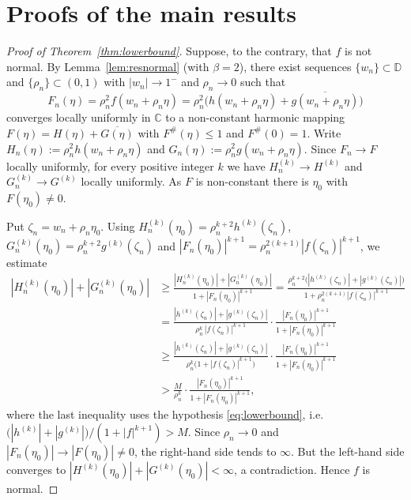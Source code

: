 \documentclass[11pt,reqno]{amsart}
\theoremstyle{definition}
\newcommand{\D}{\mathbb{D}}
\newcommand{\C}{\mathbb{C}}
\begin{document}

\section{Proofs of the main results}

\begin{proof}[Proof of Theorem~\textup{\ref{thm:lowerbound}}]
Suppose, to the contrary, that $f$ is not normal. By Lemma~\ref{lem:resnormal} (with
$\beta=2$), there exist sequences $\{w_{n}\}\subset\D$ and $\{\rho_{n}\}\subset(0,1)$ with
$|w_{n}|\to1^{-}$ and $\rho_{n}\to0$ such that
\[
F_{n}(\eta)=\rho_{n}^{2}f(w_{n}+\rho_{n}\eta)
=\rho_{n}^{2}\big(h(w_{n}+\rho_{n}\eta)+\overline{g(w_{n}+\rho_{n}\eta)}\big)
\]
converges locally uniformly in $\C$ to a non-constant harmonic mapping
$F(\eta)=H(\eta)+\overline{G(\eta)}$ with $F^{\#}(\eta)\le1$ and $F^{\#}(0)=1$. Write
$H_{n}(\eta):=\rho_{n}^{2}h(w_{n}+\rho_{n}\eta)$ and
$G_{n}(\eta):=\rho_{n}^{2}g(w_{n}+\rho_{n}\eta)$. Since $F_{n}\to F$ locally uniformly, for
every positive integer $k$ we have $H_{n}^{(k)}\to H^{(k)}$ and $G_{n}^{(k)}\to G^{(k)}$
locally uniformly. As $F$ is non-constant there is $\eta_{0}$ with $F(\eta_{0})\neq0$.

Put $\zeta_{n}=w_{n}+\rho_{n}\eta_{0}$. Using
$H_{n}^{(k)}(\eta_{0})=\rho_{n}^{k+2}h^{(k)}(\zeta_{n})$,
$G_{n}^{(k)}(\eta_{0})=\rho_{n}^{k+2}g^{(k)}(\zeta_{n})$ and
$|F_{n}(\eta_{0})|^{k+1}=\rho_{n}^{2(k+1)}|f(\zeta_{n})|^{k+1}$, we estimate
\begin{align*}
|H_{n}^{(k)}(\eta_{0})|+|G_{n}^{(k)}(\eta_{0})|
&\ge\frac{|H_{n}^{(k)}(\eta_{0})|+|G_{n}^{(k)}(\eta_{0})|}{1+|F_{n}(\eta_{0})|^{k+1}}
=\frac{\rho_{n}^{k+2}\big(|h^{(k)}(\zeta_{n})|+|g^{(k)}(\zeta_{n})|\big)}
{1+\rho_{n}^{2(k+1)}|f(\zeta_{n})|^{k+1}}\\[0.4ex]
&=\frac{|h^{(k)}(\zeta_{n})|+|g^{(k)}(\zeta_{n})|}{\rho_{n}^{k}\,|f(\zeta_{n})|^{k+1}}\cdot
\frac{|F_{n}(\eta_{0})|^{k+1}}{1+|F_{n}(\eta_{0})|^{k+1}}\\[0.4ex]
&\ge\frac{|h^{(k)}(\zeta_{n})|+|g^{(k)}(\zeta_{n})|}{\rho_{n}^{k}\big(1+|f(\zeta_{n})|^{k+1}\big)}\cdot
\frac{|F_{n}(\eta_{0})|^{k+1}}{1+|F_{n}(\eta_{0})|^{k+1}}\\[0.4ex]
&>\frac{M}{\rho_{n}^{k}}\cdot\frac{|F_{n}(\eta_{0})|^{k+1}}{1+|F_{n}(\eta_{0})|^{k+1}},
\end{align*}
where the last inequality uses the hypothesis \eqref{eq:lowerbound}, i.e.\
$\big(|h^{(k)}|+|g^{(k)}|\big)/(1+|f|^{k+1})>M$. Since $\rho_{n}\to0$ and
$|F_{n}(\eta_{0})|\to|F(\eta_{0})|\neq0$, the right-hand side tends to $\infty$. But the
left-hand side converges to $|H^{(k)}(\eta_{0})|+|G^{(k)}(\eta_{0})|<\infty$, a
contradiction. Hence $f$ is normal.
\end{proof}
\end{document}
